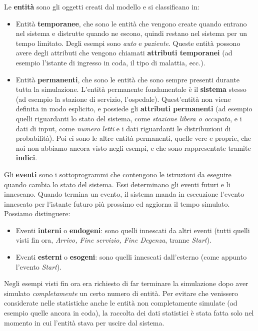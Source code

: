 \documentclass[11pt]{book}
\begin{document}
Le {\bf entit\`a} sono gli oggetti creati dal modello e si classificano
in:

\begin{itemize}
\item Entit\`a {\bf temporanee}, che sono le entit\`a che vengono create
  quando entrano nel sistema e distrutte quando ne escono, quindi
  restano nel sistema per un tempo limitato. Degli esempi sono {\em
    auto} e {\em paziente}. Queste entit\`a possono avere degli
  attributi che vengono chiamati {\bf attributi temporanei} (ad
  esempio l'istante di ingresso in coda, il tipo di malattia, ecc.).
\item Entit\`a {\bf permanenti}, che sono le entit\`a che sono sempre
  presenti durante tutta la simulazione. L'entit\`a permanente
  fondamentale \`e il {\bf sistema} stesso (ad esempio la stazione di
  servizio, l'ospedale). Quest'entit\`a non viene definita in modo
  esplicito, e possiede gli {\bf attributi permanenti} (ad esempio
  quelli riguardanti lo stato del sistema, come {\em stazione libera o
    occupata}, e i dati di input, come {\em numero letti} e i dati
  riguardanti le distribuzioni di probabilit\`a). Poi ci sono le altre entit\`a
  permanenti, quelle vere e proprie, che noi non abbiamo ancora visto
  negli esempi, e che sono rappresentate tramite {\bf indici}.
\end{itemize}

Gli {\bf eventi} sono i sottoprogrammi che contengono le istruzioni da
eseguire quando cambia lo stato del sistema. Essi determinano gli
eventi futuri e li innescano. Quando termina un evento, il sistema
manda in esecuzione l'evento innescato per l'istante futuro pi\`u
prossimo ed aggiorna il tempo simulato. Possiamo distinguere:

\begin{itemize}
\item Eventi {\bf interni} o {\bf endogeni}: sono quelli innescati da
  altri eventi (tutti quelli visti fin ora, {\em Arrivo, Fine
    servizio, Fine Degenza}, tranne {\em Start}).
\item Eventi {\bf esterni} o {\bf esogeni}: sono quelli innescati
  dall'esterno (come appunto l'evento {\em Start}). 
\end{itemize}

Negli esempi visti fin ora era richiesto di far terminare la
simulazione dopo aver simulato {\em completamente} un certo numero di
entit\`a. Per evitare che venissero considerate nelle statistiche anche
le entit\`a non completamente simulate (ad esempio quelle ancora in
coda), la raccolta dei dati statistici \`e stata fatta solo nel momento
in cui l'entit\`a stava per uscire dal sistema. 
\end{document}
